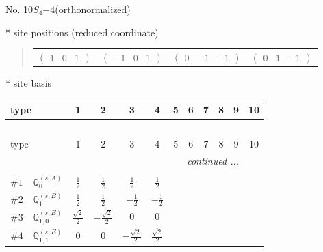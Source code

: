 \documentclass[fleqn,9pt,landscape]{jsarticle}
\begin{document}
\newpage
\begin{center}
\LARGE
No. 10\quad$S_{4}$\quad$-4$\quad[ tetragonal ] (orthonormalized)
\end{center}
\vspace{5mm}
* site positions (reduced coordinate)
\begin{quote}
\begin{tabular}{cccc}
$ \begin{pmatrix} 1 & 0 & 1 \end{pmatrix} $ & $ \begin{pmatrix} -1 & 0 & 1 \end{pmatrix} $ & $ \begin{pmatrix} 0 & -1 & -1 \end{pmatrix} $ & $ \begin{pmatrix} 0 & 1 & -1 \end{pmatrix} $
\end{tabular}
\end{quote}
* site basis
\begin{center}
\renewcommand{\arraystretch}{1.3}
\begin{longtable}{lcccccccccc}
 \hline \hline
type & 1 & 2 & 3 & 4 & 5 & 6 & 7 & 8 & 9 & 10 \\ \hline \endfirsthead

\multicolumn{10}{l}{\tablename\ \thetable{}} \\
 \hline \hline
type & 1 & 2 & 3 & 4 & 5 & 6 & 7 & 8 & 9 & 10 \\ \hline \endhead

 \hline \hline
\multicolumn{10}{r}{\footnotesize\it continued ...} \\ \endfoot

 \hline \hline
\multicolumn{10}{r}{} \\ \endlastfoot

$ \#1\quad \mathbb{Q}_{0}^{(s,A)} $ & $ \frac{1}{2} $ & $ \frac{1}{2} $ & $ \frac{1}{2} $ & $ \frac{1}{2} $ \\ \hline
$ \#2\quad \mathbb{Q}_{1}^{(s,B)} $ & $ \frac{1}{2} $ & $ \frac{1}{2} $ & $ - \frac{1}{2} $ & $ - \frac{1}{2} $ \\ \hline
$ \#3\quad \mathbb{Q}_{1,0}^{(s,E)} $ & $ \frac{\sqrt{2}}{2} $ & $ - \frac{\sqrt{2}}{2} $ & $ 0 $ & $ 0 $ \\ \hline
$ \#4\quad \mathbb{Q}_{1,1}^{(s,E)} $ & $ 0 $ & $ 0 $ & $ - \frac{\sqrt{2}}{2} $ & $ \frac{\sqrt{2}}{2} $ \\
\end{longtable}
\end{center}
\end{document}
